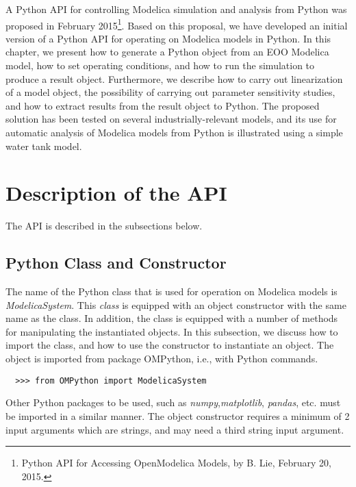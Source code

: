 A Python API for controlling Modelica simulation and analysis from Python was proposed in February 2015\footnote{Python API for Accessing OpenModelica Models, by B. Lie, February 20, 2015.}. Based on this proposal, we have developed an initial version of a Python API for operating on Modelica models in Python. In this chapter, we present how to generate a Python object from an EOO Modelica model, how to set operating conditions, and how to run the simulation to produce a result object. Furthermore, we describe how to carry out linearization of a model object, the possibility of carrying out parameter sensitivity studies, and how to extract results from the result object to Python. The proposed solution has been tested on several industrially-relevant models, and its use for automatic analysis of Modelica models from Python is illustrated using a simple water tank model.

\section{Description of the API}
\label{sec:pythonapi}

The API is described in the subsections below.

\subsection{Python Class and Constructor}
\label{subsec:pythonclass}

The name of the Python class that is used for operation on Modelica models is \textit{ModelicaSystem}.
This \textit{class} is equipped with an object constructor with the same name as the class. In addition, the class is equipped
with a number of methods for manipulating the instantiated objects. In this subsection, we discuss how to import the class, and
how to use the constructor to instantiate an object. The object is imported from package OMPython, i.e., with
Python commands.

\begin{lstlisting}
  >>> from OMPython import ModelicaSystem
\end{lstlisting}

Other Python packages to be used, such as \textit{numpy},\textit{matplotlib}, \textit{pandas}, etc. must be imported in a similar
manner. The object constructor requires a minimum of 2 input arguments which are strings, and may need a third string input
argument.

